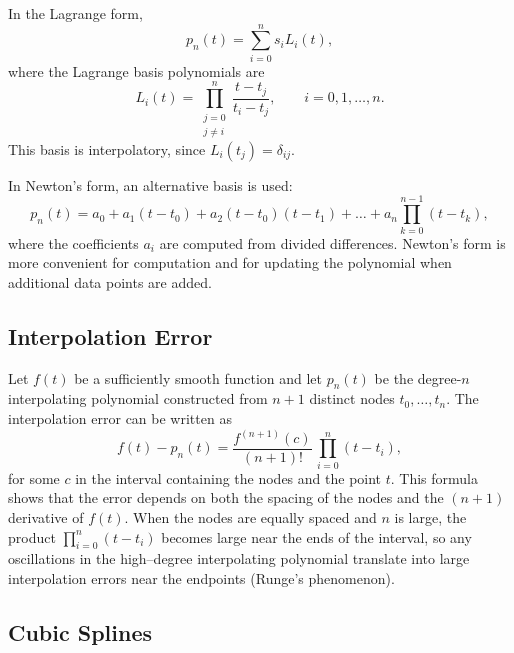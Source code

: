 \documentclass[12pt]{article}
\begin{document}
In the Lagrange form,
\begin{equation}
  p_n(t) = \sum_{i=0}^{n} s_i L_i(t),
  \label{eq:lagrange_poly}
\end{equation}
where the Lagrange basis polynomials are
\begin{equation}
  L_i(t) =
  \prod_{\substack{j=0 \\ j \neq i}}^{n}
  \frac{t - t_j}{t_i - t_j},
  \qquad i = 0,1,\dots,n.
  \label{eq:lagrange_basis}
\end{equation}
This basis is interpolatory, since $L_i(t_j) = \delta_{ij}$.

In Newton's form, an alternative basis is used:
\begin{equation}
  p_n(t) =
  a_0 + a_1 (t - t_0) + a_2 (t - t_0)(t - t_1) + \dots +
  a_n \prod_{k=0}^{n-1} (t - t_k),
  \label{eq:newton_poly}
\end{equation}
where the coefficients $a_i$ are computed from divided differences.
Newton's form is more convenient for computation and for updating the
polynomial when additional data points are added.

\subsection{Interpolation Error}

Let $f(t)$ be a sufficiently smooth function and let $p_n(t)$ be the
degree-$n$ interpolating polynomial constructed from $n+1$ distinct
nodes $t_0,\dots,t_n$. The interpolation error can be written as
\begin{equation}
  f(t) - p_n(t) =
  \frac{f^{(n+1)}(c)}{(n+1)!}\,
  \prod_{i=0}^{n} (t - t_i),
  \label{eq:interp_error}
\end{equation}
for some $c$ in the interval containing the nodes and the point $t$.
This formula shows that the error depends on both the spacing of the
nodes and the $(n+1)$ derivative of $f(t)$. When the nodes are equally
spaced and $n$ is large, the product $\prod_{i=0}^{n}(t-t_i)$ becomes
large near the ends of the interval, so any oscillations in the high--degree
interpolating polynomial translate into large interpolation errors near
the endpoints (Runge's phenomenon).

\subsection{Cubic Splines}
\end{document}
